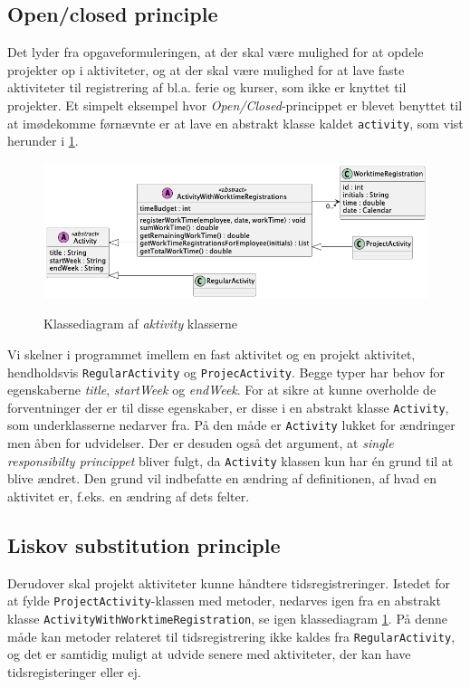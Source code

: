 \subsection{Open/closed principle} \label{sec:solid_o}
Det lyder fra opgaveformuleringen, at der skal være mulighed for at opdele projekter op i aktiviteter, og at der skal være mulighed for at lave faste aktiviteter til registrering af bl.a. ferie og kurser, som ikke er knyttet til projekter. Et simpelt eksempel hvor \textit{Open/Closed}-princippet er blevet benyttet til at imødekomme førnævnte er at lave en abstrakt klasse kaldet \texttt{activity}, som vist herunder i \cref{fig:class_activity_example}.
\begin{figure}[H]
  \centering
  \caption{Klassediagram af \textit{aktivity} klasserne}
  \includegraphics[width = 12cm, keepaspectratio]{TaskFusion/out/assets/diagrams/class_liskov_model_example/liskov_model_example.png}
  \label{fig:class_activity_example}
\end{figure}
Vi skelner i programmet imellem en fast aktivitet og en projekt aktivitet, hendholdsvis \texttt{RegularActivity} og \texttt{ProjecActivity}. Begge typer har behov for egenskaberne \textit{title}, \textit{startWeek} og \textit{endWeek}. For at sikre at kunne overholde de forventninger der er til disse egenskaber, er disse i en abstrakt klasse \texttt{Activity}, som underklasserne nedarver fra. På den måde er \texttt{Activity} lukket for ændringer men åben for udvidelser.
Der er desuden også det argument, at \textit{single responsibilty princippet} bliver fulgt, da \texttt{Activity} klassen kun har én grund til at blive ændret. Den grund vil indbefatte en ændring af definitionen, af hvad en aktivitet er, f.eks. en ændring af dets felter.
\subsection{Liskov substitution principle} \label{sec:solid_l}
Derudover skal projekt aktiviteter kunne håndtere tidsregistreringer. Istedet for at fylde \texttt{ProjectActivity}-klassen med metoder, nedarves igen fra en abstrakt klasse \texttt{ActivityWithWorktimeRegistration}, se igen klassediagram \cref{fig:class_activity_example}. På denne måde kan metoder relateret til tidsregistrering ikke kaldes fra \texttt{RegularActivity}, og det er samtidig muligt at udvide senere med aktiviteter, der kan have tidsregisteringer eller ej.
